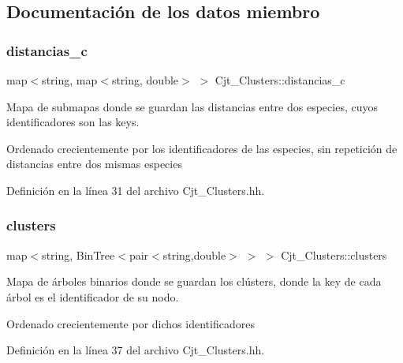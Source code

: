 \subsection{Documentación de los datos miembro}
\mbox{\label{class_cjt___clusters_a2b912c7987fd370bdeaf5dabb966240f}} 
\subsubsection{\texorpdfstring{distancias\+\_\+c}{distancias\_c}}
{\footnotesize\ttfamily map$<$string, map$<$string, double$>$ $>$ Cjt\+\_\+\+Clusters\+::distancias\+\_\+c\hspace{0.3cm}{\ttfamily [private]}}



Mapa de submapas donde se guardan las distancias entre dos especies, cuyos identificadores son las keys. 

Ordenado crecientemente por los identificadores de las especies, sin repetición de distancias entre dos mismas especies 

Definición en la línea 31 del archivo Cjt\+\_\+\+Clusters.\+hh.

\mbox{\label{class_cjt___clusters_a866c5a14f8f50598be2af9fd8c115dd2}} 
\subsubsection{\texorpdfstring{clusters}{clusters}}
{\footnotesize\ttfamily map$<$string, Bin\+Tree$<$pair$<$string,double$>$ $>$ $>$ Cjt\+\_\+\+Clusters\+::clusters\hspace{0.3cm}{\ttfamily [private]}}



Mapa de árboles binarios donde se guardan los clústers, donde la key de cada árbol es el identificador de su nodo. 

Ordenado crecientemente por dichos identificadores 

Definición en la línea 37 del archivo Cjt\+\_\+\+Clusters.\+hh.

\mbox{\label{class_cjt___clusters_af010e61859190999fb23f1854f4d23aa}} 
